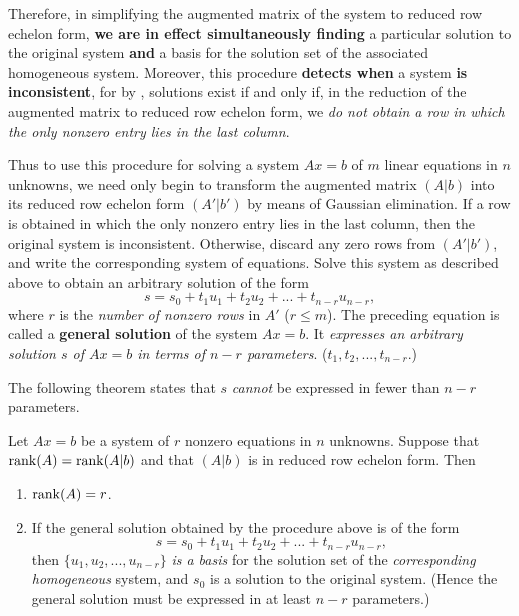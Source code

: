 Therefore, in simplifying the augmented matrix of the system to reduced row echelon form, \textbf{we are in effect simultaneously finding} a particular solution to the original system \textbf{and} a basis for the solution set of the associated homogeneous system.
Moreover, this procedure \textbf{detects when} a system \textbf{is inconsistent}, for by ,
solutions exist if and only if, in the reduction of the augmented matrix to reduced row echelon form, we \emph{do not obtain a row in which the only nonzero entry lies in the last column}.

Thus to use this procedure for solving a system \(Ax = b\) of \(m\) linear equations in \(n\) unknowns, we need only begin to transform the augmented matrix \((A|b)\) into its reduced row echelon form \((A'|b')\) by means of Gaussian elimination.
If a row is obtained in which the only nonzero entry lies in the last column, then the original system is inconsistent.
Otherwise, discard any zero rows from \((A'|b')\), and write the corresponding system of equations.
Solve this system as described above to obtain an arbitrary solution of the form
\[
    s = s_0 + t_1 u_1 + t_2 u_2 + ... + t_{n - r} u_{n - r},
\]
where \(r\) is the \emph{number of nonzero rows} in \(A'\) (\(r \le m\)).
The preceding equation is called a \textbf{general solution} of the system \(Ax = b\).
It \emph{expresses an arbitrary solution \(s\) of \(Ax = b\) in terms of \(n - r\) parameters}.
(\(t_1, t_2, ..., t_{n - r}\).)

The following theorem states that \(s\) \emph{cannot} be expressed in fewer than \(n - r\) parameters.

\begin{theorem} \label{thm 3.15}
Let \(Ax = b\) be a system of \(r\) nonzero equations in \(n\)
unknowns.
Suppose that \(\mathrm{rank}(A) = \mathrm{rank}(A|b)\) and that \((A|b)\) is in reduced row echelon form.
Then
\begin{enumerate}
\item \(\mathrm{rank}(A) = r\).
\item If the general solution obtained by the procedure above is of the form
\[
    s = s_0 + t_1 u_1 + t_2 u_2 + ... + t_{n - r} u_{n - r},
\]
then \(\{ u_1, u_2, ..., u_{n-r} \}\) \emph{is a basis} for the solution set of the \emph{corresponding homogeneous} system,
and \(s_0\) is a solution to the original system.
(Hence the general solution must be expressed in at least \(n - r\) parameters.)
\end{enumerate}
\end{theorem}

